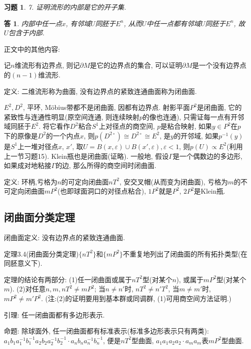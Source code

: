 \documentclass{ctexart}%
\newtheorem*{exercise}{习题}
\newtheorem*{solution}{答}
\theoremstyle{definition}
\theoremstyle{remark}
\begin{document}
\begin{exercise}7. 证明流形的内部是它的开子集.
\end{exercise}
\begin{solution}
内部中任一点$x$, 有邻域$U$同胚于$ E^n$, 从而$U$中任一点都有邻域$U$同胚于$E^n$, 故$U$包含于内部.
\end{solution}

正文中的其他内容: 

记$n$维流形有边界点, 则记$\partial M$是它的边界点的集合, 可以证明$\partial M$是一个没有边界点的$(n-1)$维流形.

定义:  二维流形称为曲面, 没有边界点的紧致连通曲面称为闭曲面. 

$E^2, D^2$, 平环, M\"{o}bius带都不是闭曲面, 因都有边界点. 射影平面$P^2$是闭曲面, 它的紧致性与连通性明显(原空间连通, 则连续映射$p$的像也连通), 只需证每一点有开邻域同胚于$E^2$. 将它看作$D^2$粘合$S^1$上对径点的商空间, $p$是粘合映射, 如果$y\in P^2$在$p$下的原像是$D^2$的一个内点$x$, 则$p(D^{2\circ})\cong D^{2\circ} \cong E^2$, 是$y$的开邻域, 如果$p^{-1}(y)$是$S^1$上一堆对径点$x$, $x'$, 取$U=B(x,\varepsilon)\cup B(x',\varepsilon),\varepsilon <1$, 则$p(U)\propto E^2$(利用上一节习题15). Klein瓶也是闭曲面(证略). 一般地, 假设$\Gamma$是一个偶数边的多边形, 如果成对地粘接$\Gamma$的边, 那么所得的商空间时闭曲面. 

定义: 环柄,亏格为$n$的可定向闭曲面$nT^2$, 安交叉帽(从而变为闭曲面), 亏格为$m$的不可定向闭曲面$mP^2$(也即球面洞口的对径点粘合), $1P^2$就是$P^2$, $2P^2$是Klein瓶. 


\subsection{闭曲面分类定理}

闭曲面定义: 没有边界点的紧致连通曲面. 

定理3.4(闭曲面分类定理)$\{nT^2\}$和$\{mP^2\}$不重复地列出了闭曲面的所有拓扑类型(在同胚意义下).

定理的结论有两部分: (1)任一闭曲面或属于$nT^2$型(对某个$n$), 或属于$mP^2$型(对某个$m$). (2)对任意$n,m,
nT^2\neq mP^2$; 当$n\neq n'$时, $nT^2\neq n'T^2$, 当$m\neq m'$时, $mP^2\neq m' P^2$. (注:(2)的证明要用到基本群或同调群, (1)可用商空间方法证明.)

引理: 任一闭曲面都有多边形表示. 

命题: 除球面外, 任一闭曲面都有标准表示(标准多边形表示只有两类): $a_1b_1a^{-1}_1b^{-1}_1a_2b_2a^{-1}_2b^{-1}_2\cdot a_nb_na^{-1}_nb^{-1}_n$, 便是$nT^2$型曲面, $a_1a_1a_2a_2\cdot a_ma_m$表$mP^2$型曲面.
\end{document}
